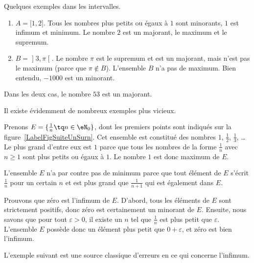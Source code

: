 \begin{example}
	Quelques exemples dans les intervalles.
	\begin{enumerate}
		\item
		      \( A=\mathopen[ 1 , 2 \mathclose]\). Tous les nombres plus petits ou égaux à \( 1\) sont minorants, \( 1\) est infimum et minimum. Le nombre \( 2\) est un majorant, le maximum et le supremum.
		\item
		      \( B=\mathopen] 3 , \pi \mathclose[\). Le nombre \( \pi\) est le supremum et est un majorant, mais n'est pas le maximum (parce que \( \pi\notin B\)). L'ensemble \( B\) n'a pas de maximum. Bien entendu, \( -1000\) est un minorant.
	\end{enumerate}
	Dans les deux cas, le nombre \( 53\) est un majorant.
\end{example}

Il existe évidemment de nombreux exemples plus vicieux.

\begin{example}
	Prenons \( E=\{ \frac{1}{ n }\tq n\in\eN_0 \}\), dont les premiers points sont indiqués sur la figure~\ref{LabelFigSuiteUnSurn}. Cet ensemble est constitué des nombres \( 1\), \( \frac{ 1 }{2}\), \( \frac{1}{ 3 }\), \ldots{} Le plus grand d'entre eux est \( 1\) parce que tous les nombres de la forme \( \frac{1}{ n }\) avec \( n\geq 1\) sont plus petits ou égaux à \( 1\). Le nombre \( 1\) est donc maximum de \( E\).

	L'ensemble \( E\) n'a par contre pas de minimum parce que tout élément de \( E\) s'écrit \( \frac{1}{ n }\) pour un certain \( n\) et est plus grand que \( \frac{1}{ n+1 }\) qui est également dans \( E\).

	Prouvons que zéro est l'infimum de \( E\). D'abord, tous les éléments de \( E\) sont strictement positifs, donc zéro est certainement un minorant de \( E\). Ensuite, nous savons que pour tout \( \varepsilon>0\), il existe un \( n\) tel que \( \frac{1}{ n }\) est plus petit que \( \varepsilon\). L'ensemble \( E\) possède donc un élément plus petit que \( 0+\varepsilon\), et zéro est bien l'infimum.
\end{example}

\newcommand{\CaptionFigSuiteUnSurn}{Les premiers points du type \( x_n=1/n\).}


L'exemple suivant est une source classique d'erreurs en ce qui concerne l'infimum.

